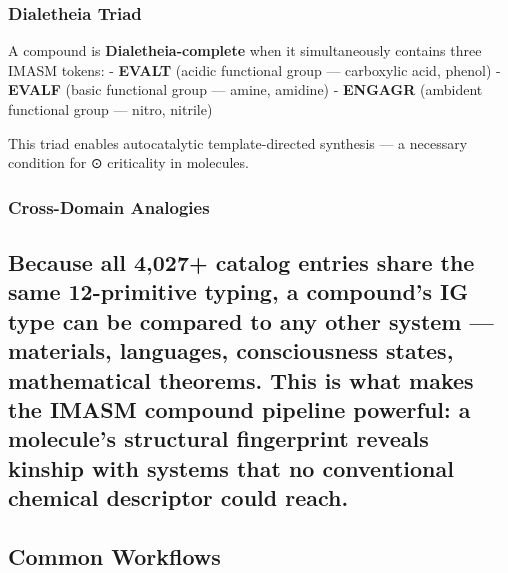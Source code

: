 \hypertarget{dialetheia-triad}{%
\subsubsection{Dialetheia Triad}\label{dialetheia-triad}}

A compound is \textbf{Dialetheia-complete} when it simultaneously
contains three IMASM tokens: - \textbf{EVALT} (acidic functional group
--- carboxylic acid, phenol) - \textbf{EVALF} (basic functional group
--- amine, amidine) - \textbf{ENGAGR} (ambident functional group ---
nitro, nitrile)

This triad enables autocatalytic template-directed synthesis --- a
necessary condition for ⊙ criticality in molecules.

\hypertarget{cross-domain-analogies}{%
\subsubsection{Cross-Domain Analogies}\label{cross-domain-analogies}}

\hypertarget{because-all-4027-catalog-entries-share-the-same-12-primitive-typing-a-compounds-ig-type-can-be-compared-to-any-other-system-materials-languages-consciousness-states-mathematical-theorems.-this-is-what-makes-the-imasm-compound-pipeline-powerful-a-molecules-structural-fingerprint-reveals-kinship-with-systems-that-no-conventional-chemical-descriptor-could-reach.}{%
\subsection{Because all 4,027+ catalog entries share the same
12-primitive typing, a compound's IG type can be compared to any other
system --- materials, languages, consciousness states, mathematical
theorems. This is what makes the IMASM compound pipeline powerful: a
molecule's structural fingerprint reveals kinship with systems that no
conventional chemical descriptor could
reach.}\label{because-all-4027-catalog-entries-share-the-same-12-primitive-typing-a-compounds-ig-type-can-be-compared-to-any-other-system-materials-languages-consciousness-states-mathematical-theorems.-this-is-what-makes-the-imasm-compound-pipeline-powerful-a-molecules-structural-fingerprint-reveals-kinship-with-systems-that-no-conventional-chemical-descriptor-could-reach.}}

\hypertarget{common-workflows}{%
\subsection{Common Workflows}\label{common-workflows}}

